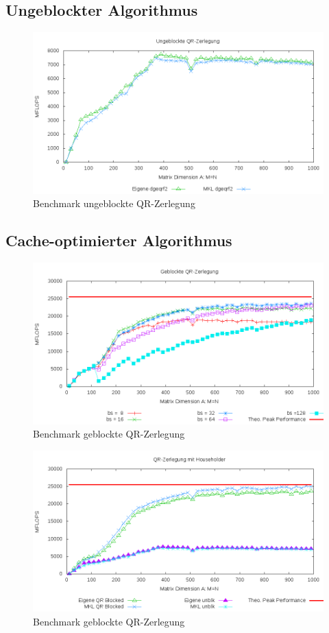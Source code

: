 \subsection{Ungeblockter Algorithmus}

\begin{figure}[H]
	\includegraphics[width=\textwidth]{images/unblk.png}
	\caption{Benchmark ungeblockte QR-Zerlegung}
	\label{img:unblk}
\end{figure}

\subsection{Cache-optimierter Algorithmus}

\begin{figure}[H]
	\includegraphics[width=\textwidth]{images/blkbs.png}
	\caption{Benchmark geblockte QR-Zerlegung}
	\label{img:blk}
\end{figure}

\begin{figure}[H]
  \includegraphics[width=\textwidth]{images/both.png}
  \caption{Benchmark geblockte QR-Zerlegung}
  \label{img:blk}
\end{figure}









   
